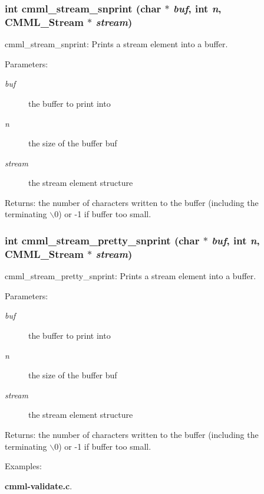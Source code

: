 \subsubsection{\setlength{\rightskip}{0pt plus 5cm}int cmml\_\-stream\_\-snprint (char $\ast$ {\em buf}, int {\em n}, {\bf CMML\_\-Stream} $\ast$ {\em stream})}\label{cmml_8h_a75}


cmml\_\-stream\_\-snprint: Prints a stream element into a buffer.

\begin{Desc}
\item[Parameters:]
\begin{description}
\item[{\em buf}]the buffer to print into \item[{\em n}]the size of the buffer buf \item[{\em stream}]the stream element structure\end{description}
\end{Desc}
\begin{Desc}
\item[Returns:]the number of characters written to the buffer (including the terminating $\backslash$0) or -1 if buffer too small. \end{Desc}
\subsubsection{\setlength{\rightskip}{0pt plus 5cm}int cmml\_\-stream\_\-pretty\_\-snprint (char $\ast$ {\em buf}, int {\em n}, {\bf CMML\_\-Stream} $\ast$ {\em stream})}\label{cmml_8h_a76}


cmml\_\-stream\_\-pretty\_\-snprint: Prints a stream element into a buffer.

\begin{Desc}
\item[Parameters:]
\begin{description}
\item[{\em buf}]the buffer to print into \item[{\em n}]the size of the buffer buf \item[{\em stream}]the stream element structure\end{description}
\end{Desc}
\begin{Desc}
\item[Returns:]the number of characters written to the buffer (including the terminating $\backslash$0) or -1 if buffer too small. \end{Desc}
\begin{Desc}
\item[Examples: ]\par
{\bf cmml-validate.c}.\end{Desc}
